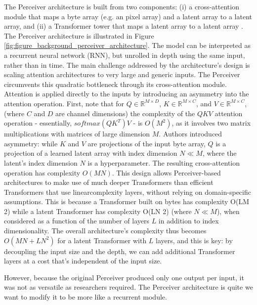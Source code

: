 The Perceiver architecture is built from two components: (i) a cross-attention module that maps a byte array (e.g. an pixel array) and a latent array to a latent array, and (ii) a Transformer tower that maps a latent array to a latent array \cite{jaeglePerceiverGeneralPerception2021}. The Perceiver architecture is illustrated in Figure \ref{fig:figure_background_perceiver_architecture}. The model can be interpreted as a recurrent neural network (RNN), but unrolled in depth using the same input, rather than in time. The main challenge addressed by the architecture's design is scaling attention architectures to very large and generic inputs. The Perceiver circumvents this quadratic bottleneck through its cross-attention module. Attention is applied directly to the inputs by introducing an asymmetry into the attention operation. First, note that for $Q \in \mathbb{R}^{M \times D}$, $K \in \mathbb{R}^{M \times C}$, and $V \in \mathbb{R}^{M \times C}$, (where $C$ and $D$ are channel dimensions) the complexity of the $QKV$ attention operation - essentially, $softmax(QK^T)V$ - is $O(M^2)$, as it involves two matrix multiplications with matrices of large dimension $M$. Authors introduced asymmetry: while $K$ and $V$ are projections of the input byte array, $Q$ is a projection of a learned latent array with index dimension $N \ll M$, where the latent's index dimension $N$ is a hyperparameter. The resulting cross-attention operation has complexity $O(MN)$. This design allows Perceiver-based architectures to make use of much deeper Transformers than efficient Transformers that use linearcomplexity layers, without relying on domain-specific assumptions. This is because a Transformer built on bytes has complexity O(LM 2) while a latent Transformer has complexity O(LN 2) (where $N \ll M$), when considered as a function of the number of layers $L$ in addition to index dimensionality. The overall architecture's complexity thus becomes $O(MN + LN^2)$ for a latent Transformer with $L$ layers, and this is key: by decoupling the input size and the depth, we can add additional Transformer layers at a cost that’s independent of the input size.

However, because the original Perceiver produced only one output per input, it was not as versatile as researchers required. The Perceiver architecture is quite we want to modify it to be more like a recurrent module.